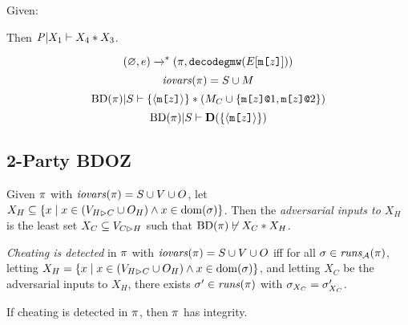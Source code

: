 \begin{lemma}
  Given:
  \begin{mathpar}
    

  \end{mathpar}
    Then $\condsep{\pmf}{X_1}{X_4}{X_3}$.
\end{lemma}

\begin{lemma}
  $$ (\varnothing,e) \redxs (\prog,\decodegmw(E[\mesg{z}])) $$
  $$\iov(\prog) = S \cup M$$
  $$\condsep{\progtt(\prog)}{S}{\{\macgv{\mesg{z}}\}}{(M_C \cup \{ \elab{\mesg{z}}{1}, \elab{\mesg{z}}{2} \})}$$
  $$\conddetx{\progtt(\prog)}{S}{\{\macgv{\mesg{z}}\}}$$
\end{lemma}

\begin{mathpar}
  
  
\end{mathpar}

\subsection{2-Party BDOZ}




\begin{definition}
  Given $\prog$ with $\iov(\prog) = S \cup V \cup O$,
  let $X_H \subseteq \{ x \mid x \in (\houtputs \cup O_H) \wedge x \in \dom(\store) \}$.
  Then the \emph{adversarial inputs to $X_H$} is the least set
  $X_C \subseteq \cinputs$ such that $\progtt(\prog) \not\vdash X_C * X_H$.
\end{definition}
\begin{definition}
  \emph{Cheating is detected} in $\prog$ with $\iov(\prog) = S \cup V \cup O$ iff
  for all  $\store \in \aruns(\prog)$,
  letting $X_H = \{ x \mid x \in (\houtputs \cup O_H) \wedge x \in \dom(\store) \}$,
  and letting $X_C$ be the adversarial inputs to $X_H$,
  there exists $\sigma'\in \runs(\prog)$
  with $\store_{X_C} = \store'_{X_C}$.  
\end{definition}

\begin{lemma}
  If cheating is detected in $\prog$, then $\prog$ has integrity.
\end{lemma}
